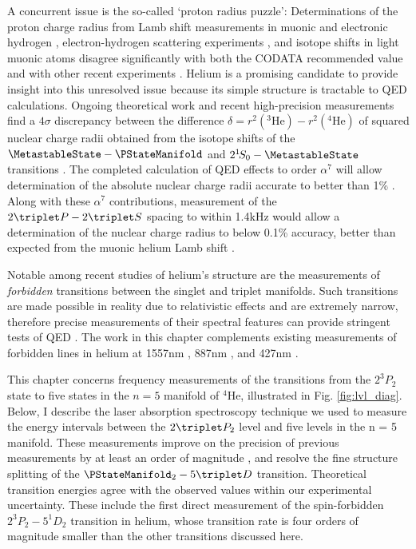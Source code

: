   A concurrent issue is the so-called `proton radius puzzle': Determinations of the proton charge radius from Lamb shift measurements in muonic and electronic hydrogen \cite{Pohl10, Bezginov19}, electron-hydrogen scattering experiments \cite{Beyer17,Xiong19}, and isotope shifts in light muonic atoms \cite{Kalinowski19,Pohl16} disagree significantly with both the CODATA recommended value and with other recent experiments \cite{Fleurbaey18}.
	 Helium is a promising candidate to provide insight into this unresolved issue because its simple structure is tractable to QED calculations.
	Ongoing theoretical work \cite{Pachucki15,Pachucki17,Pachucki11,Pachucki10,Morton12,Morton06,Patkos16,Patkos17} and recent high-precision measurements \cite{Rooij11,Notermans14,Notermans16,Rengelink18} find a $4\sigma$ discrepancy between the difference $\delta = r^2(^3\textrm{He}) - r^2(^4\textrm{He})$ of squared nuclear charge radii obtained from the isotope shifts of the $\MetastableState - \PStateManifold$ and ${2^{1\!}S_{0}} - \MetastableState$ transitions \cite{Pachucki15,Patkos17}.
	The completed calculation of QED effects to order $\alpha^7$ will allow determination of the absolute nuclear charge radii accurate to better than 1\% \cite{Pachucki17}.
	Along with these $\alpha^7$ contributions, measurement of the $2\triplet P-2\triplet S$ spacing to within 1.4kHz would allow a determination of the nuclear charge radius to below 0.1\% accuracy, better than expected from the muonic helium Lamb shift \cite{Wienczek19}.
	 
  Notable among recent studies of helium's structure are the measurements of \emph{forbidden} transitions between the singlet and triplet manifolds.
	Such transitions are made possible in reality due to relativistic effects and are extremely narrow, therefore precise measurements of their spectral features can provide stringent tests of QED \cite{Lach01}.
	The work in this chapter complements existing measurements of forbidden lines in helium at 1557nm \cite{Rooij11,Rengelink18}, 887nm \cite{Notermans14}, and 427nm \cite{Thomas20}.

	This chapter concerns frequency measurements of the transitions from the $2^3P_2$ state to five states in the $n=5$ manifold of $^4$He, illustrated in Fig.
	\ref{fig:lvl_diag}.
	Below, I describe the laser absorption spectroscopy technique we used to measure the energy intervals between the $2\triplet P_2$ level and five levels in the n = 5 manifold.
	These measurements improve on the precision of previous measurements by at least an order of magnitude \cite{Martin60}, and resolve the fine structure splitting of the $\PStateManifold_2 - 5\triplet D$ transition.
	Theoretical transition energies agree with the observed values within our experimental uncertainty.
	These include the first direct measurement of the spin-forbidden $2^{3\!}P_2 - 5^{1\!}D_2$ transition in helium, whose transition rate is four orders of magnitude smaller than the other transitions discussed here.  

